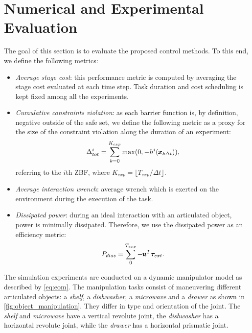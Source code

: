 \section{Numerical and Experimental Evaluation} \label{sec:experiments}

The goal of this section is to evaluate the proposed control methods. To this end, we define the following metrics:
\begin{itemize}
    \item \textit{Average stage cost}: this performance metric is computed by averaging the stage cost evaluated at each time step. Task duration and cost scheduling is kept fixed among all the experiments.  
    \item \textit{Cumulative constraints violation}: as each barrier function is, by definition, negative outside of the safe set, we define the following metric as a proxy for the size of the constraint violation along the duration of an experiment:
    \begin{equation*}
        \Delta^{i}_{tot} = \sum\limits_{k=0}^{K_{exp}} \max(0, -h^i(\pmb{x}_{k \Delta t})),
    \end{equation*}
    referring to the $i$th ZBF, where $K_{exp} = \lfloor T_{exp} / \Delta t \rfloor$.
    \item \textit{Average interaction wrench}: average wrench which is exerted on the environment during the execution of the task.
    \item \textit{Dissipated power}: during an ideal interaction with an articulated object, power is minimally dissipated. Therefore, we use the dissipated power as an efficiency metric:
    \begin{equation}
        P_{diss} = \sum\limits_{0}^{T_{exp}} -\pmb{u}^T \boldsymbol{\tau}_{ext}.
    \end{equation}
\end{itemize}
The simulation experiments are conducted on a dynamic manipulator model as described by \eqref{eq:eom}. The manipulation tasks consist of maneuvering different articulated objects: a \textit{shelf}, a \textit{dishwasher}, a \textit{microwave} and a \textit{drawer} as shown in \fig\ref{fig:object_manipulation}. They differ in type and orientation of the joint. The \textit{shelf} and \textit{microwave} have a vertical revolute joint, the \textit{dishwasher} has a horizontal revolute joint, while the \textit{drawer} has a horizontal prismatic joint.
  
